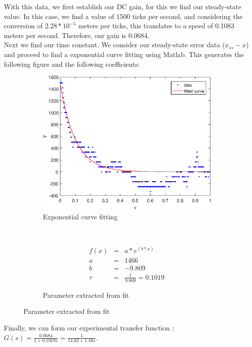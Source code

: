 \documentclass{article}
\begin{document}
With this data, we first establish our DC gain, for this we find our steady-state value. In this case, we find a value of 1500 ticks per second, and considering the conversion of $2.28 * 10^{-5}$ meters per ticks, this translates to a speed of 0.1083 meters per second. Therefore, our gain is 0.0684.\\
Next we find our time constant. We consider our steady-state error data ($x_{ss} - x$) and proceed to find a exponential curve fitting using Matlab. This generates the following figure and the following coefficients:
\begin{figure}[!htb]
    \centering
    \begin{subfigure}[b]{0.4\textwidth}
        \includegraphics[width=\textwidth]{../Experiments/fitted_data.eps}
        \caption{Exponential curve fitting}
        \label{fig:fit1}
    \end{subfigure}
    ~ \begin{subfigure}[b]{0.4\textwidth}
        \begin{eqnarray*}
            f(x) &=& a*e^{(b*x)}\\
            a &=& 1466\\
            b &=& -9.809\\
            \tau &=& \frac{1}{9.809} = 0.1019
        \end{eqnarray*}
        \caption{Parameter extracted from fit}
    \end{subfigure}
\end{figure}

Finally, we can form our experimental transfer function : $G(s) = \frac{0.0684}{1 + 0.1019s} = \frac{1}{14.62 + 1.49s}$.
\end{document}
